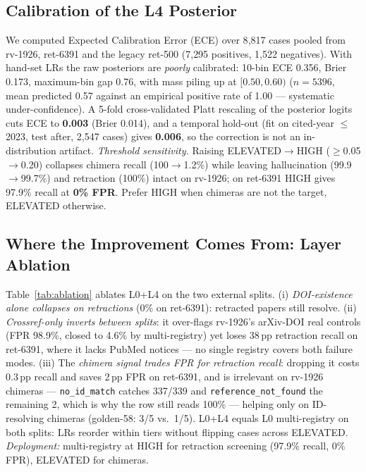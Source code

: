 \documentclass[runningheads]{llncs}
\begin{document}
\subsection{Calibration of the L4 Posterior}
\label{ssec:calib}

We computed Expected Calibration Error (ECE) over 8{,}817 cases pooled from rv-1926, ret-6391 and the legacy ret-500 (7{,}295 positives, 1{,}522 negatives). With hand-set LRs the raw posteriors are \emph{poorly} calibrated: 10-bin ECE 0.356, Brier 0.173, maximum-bin gap 0.76, with mass piling up at $[0.50,0.60)$ ($n{=}5396$, mean predicted 0.57 against an empirical positive rate of 1.00 --- systematic under-confidence). A 5-fold cross-validated Platt rescaling of the posterior logits cuts ECE to \textbf{0.003} (Brier 0.014), and a temporal hold-out (fit on cited-year $\leq$2023, test after, 2{,}547 cases) gives \textbf{0.006}, so the correction is not an in-distribution artifact.
\emph{Threshold sensitivity.} Raising ELEVATED$\to$HIGH ($\geq$0.05$\to$0.20) collapses chimera recall (100$\to$1.2\%) while leaving hallucination (99.9$\to$99.7\%) and retraction (100\%) intact on rv-1926; on ret-6391 HIGH gives 97.9\% recall at \textbf{0\% FPR}. Prefer HIGH when chimeras are not the target, ELEVATED otherwise.


\subsection{Where the Improvement Comes From: Layer Ablation}
\label{sec:ablation}

Table~\ref{tab:ablation} ablates L0+L4 on the two external splits. (i) \emph{DOI-existence alone collapses on retractions} (0\% on ret-6391): retracted papers still resolve. (ii) \emph{Crossref-only inverts between splits}: it over-flags rv-1926's arXiv-DOI real controls (FPR 98.9\%, closed to 4.6\% by multi-registry) yet loses 38\,pp retraction recall on ret-6391, where it lacks PubMed notices --- no single registry covers both failure modes. (iii) The \emph{chimera signal trades FPR for retraction recall}: dropping it costs 0.3\,pp recall and saves 2\,pp FPR on ret-6391, and is irrelevant on rv-1926 chimeras --- \texttt{no\_id\_match} catches 337/339 and \texttt{reference\_not\_found} the remaining 2, which is why the row still reads 100\% --- helping only on ID-resolving chimeras (golden-58: 3/5 vs.\ 1/5). L0+L4 equals L0 multi-registry on both splits: LRs reorder within tiers without flipping cases across ELEVATED. \emph{Deployment:} multi-registry at HIGH for retraction screening (97.9\% recall, 0\% FPR), ELEVATED for chimeras.
\end{document}
